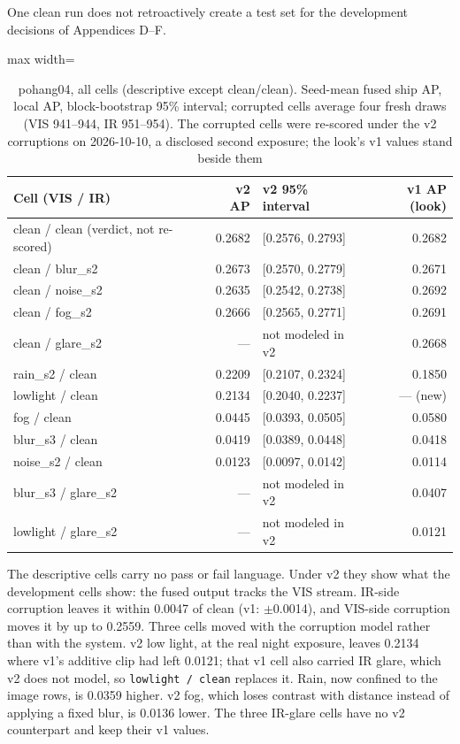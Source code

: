 \documentclass[journal,onecolumn]{IEEEtran}
\begin{document}
One clean run does not retroactively create a test set for the development decisions of Appendices D--F.

\begin{table}[htbp]
\centering
\small
\caption{pohang04, all cells (descriptive except clean/clean). Seed-mean fused ship AP, local AP, block-bootstrap 95\% interval; corrupted cells average four fresh draws (VIS 941--944, IR 951--954). The corrupted cells were re-scored under the v2 corruptions on 2026-10-10, a disclosed second exposure; the look's v1 values stand beside them}
\label{tab:16}
\begin{adjustbox}{max width=\linewidth}
\begin{tabular}{lrlr}
\toprule
Cell (VIS / IR) & v2 AP & v2 95\% interval & v1 AP (look) \\
\midrule
clean / clean (verdict, not re-scored) & 0.2682 & [0.2576, 0.2793] & 0.2682 \\
clean / blur\_s2 & 0.2673 & [0.2570, 0.2779] & 0.2671 \\
clean / noise\_s2 & 0.2635 & [0.2542, 0.2738] & 0.2692 \\
clean / fog\_s2 & 0.2666 & [0.2565, 0.2771] & 0.2691 \\
clean / glare\_s2 & --- & not modeled in v2 & 0.2668 \\
rain\_s2 / clean & 0.2209 & [0.2107, 0.2324] & 0.1850 \\
lowlight / clean & 0.2134 & [0.2040, 0.2237] & --- (new) \\
fog / clean & 0.0445 & [0.0393, 0.0505] & 0.0580 \\
blur\_s3 / clean & 0.0419 & [0.0389, 0.0448] & 0.0418 \\
noise\_s2 / clean & 0.0123 & [0.0097, 0.0142] & 0.0114 \\
blur\_s3 / glare\_s2 & --- & not modeled in v2 & 0.0407 \\
lowlight / glare\_s2 & --- & not modeled in v2 & 0.0121 \\
\bottomrule
\end{tabular}
\end{adjustbox}
\end{table}
The descriptive cells carry no pass or fail language. Under v2 they show what the development cells show: the fused output tracks the VIS stream. IR-side corruption leaves it within 0.0047 of clean (v1: $\pm$0.0014), and VIS-side corruption moves it by up to 0.2559. Three cells moved with the corruption model rather than with the system. v2 low light, at the real night exposure, leaves 0.2134 where v1's additive clip had left 0.0121; that v1 cell also carried IR glare, which v2 does not model, so \texttt{lowlight /\allowbreak{} clean} replaces it. Rain, now confined to the image rows, is 0.0359 higher. v2 fog, which loses contrast with distance instead of applying a fixed blur, is 0.0136 lower. The three IR-glare cells have no v2 counterpart and keep their v1 values.
\end{document}
